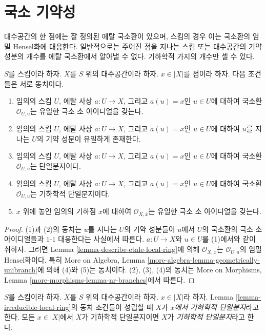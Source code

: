 \section{국소 기약성}
\label{section-irreducible-local-ring}

\noindent
대수공간의 한 점에는 잘 정의된 에탈 국소환이 있으며, 스킴의 경우
이는 국소환의 엄밀 Hensel화에 대응한다. 일반적으로는 주어진 점을
지나는 스킴 또는 대수공간의 기약 성분의 개수를 에탈 국소환에서
알아낼 수 없다. 기하학적 가지의 개수만 셀 수 있다.

\begin{lemma}
\label{lemma-irreducible-local-ring}
$S$를 스킴이라 하자.
$X$를 $S$ 위의 대수공간이라 하자.
$x \in |X|$를 점이라 하자.
다음 조건들은 서로 동치이다.
\begin{enumerate}
\item 임의의 스킴 $U$, 에탈 사상 $a : U \to X$, 그리고
$a(u) = x$인 $u \in U$에 대하여 국소환 $\mathcal{O}_{U, u}$는
유일한 극소 소 아이디얼을 갖는다.
\item 임의의 스킴 $U$, 에탈 사상 $a : U \to X$, 그리고
$a(u) = x$인 $u \in U$에 대하여 $u$를 지나는 $U$의 기약 성분이
유일하게 존재한다.
\item 임의의 스킴 $U$, 에탈 사상 $a : U \to X$, 그리고
$a(u) = x$인 $u \in U$에 대하여 국소환 $\mathcal{O}_{U, u}$는
단일분지이다.
\item 임의의 스킴 $U$, 에탈 사상 $a : U \to X$, 그리고
$a(u) = x$인 $u \in U$에 대하여 국소환 $\mathcal{O}_{U, u}$는
기하학적 단일분지이다.
\item $x$ 위에 놓인 임의의 기하점 $\overline{x}$에 대하여
$\mathcal{O}_{X, \overline{x}}$는 유일한 극소 소 아이디얼을 갖는다.
\end{enumerate}
\end{lemma}

\begin{proof}
(1)과 (2)의 동치는 $u$를 지나는 $U$의 기약 성분들이
$u$에서 $U$의 국소환의 극소 소 아이디얼들과 $1$-$1$ 대응한다는
사실에서 따른다. $a : U \to X$와 $u \in U$를 (1)에서와 같이
취하자. 그러면 Lemma \ref{lemma-describe-etale-local-ring}에 의해
$\mathcal{O}_{X, \overline{x}}$는 $\mathcal{O}_{U, u}$의
엄밀 Hensel화이다. 특히 More on Algebra, Lemma
\ref{more-algebra-lemma-geometrically-unibranch}에 의해
(4)와 (5)는 동치이다.
(2), (3), (4)의 동치는 More on Morphisms, Lemma
\ref{more-morphisms-lemma-nr-branches}에서 따른다.
\end{proof}

\begin{definition}
\label{definition-unibranch}
$S$를 스킴이라 하자. $X$를 $S$ 위의 대수공간이라 하자.
$x \in |X|$라 하자. Lemma \ref{lemma-irreducible-local-ring}의
동치 조건들이 성립할 때 $X$가 {\it $x$에서 기하학적 단일분지}라고
한다. 모든 $x \in |X|$에서 $X$가 기하학적 단일분지이면
$X$가 {\it 기하학적 단일분지}라고 한다.
\end{definition}

